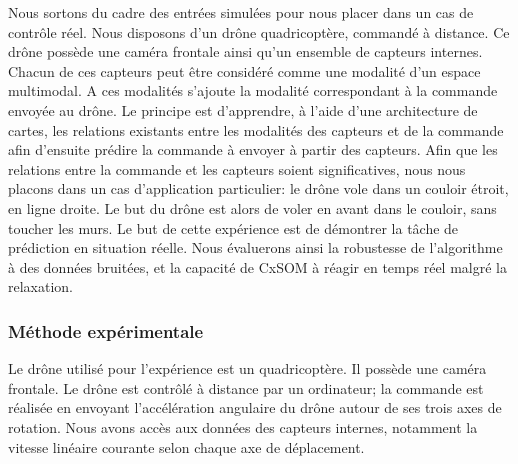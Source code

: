 \documentclass[../main]{subfiles}
\begin{document}
Nous sortons du cadre des entrées simulées pour nous placer dans un cas de contrôle réel. Nous disposons d'un drône quadricoptère, commandé à distance. Ce drône possède une caméra frontale ainsi qu'un ensemble de capteurs internes. Chacun de ces capteurs peut être considéré comme une modalité d'un espace multimodal. A ces modalités s'ajoute la modalité correspondant à la commande envoyée au drône.
Le principe est d'apprendre, à l'aide d'une architecture de cartes, les relations existants entre les modalités des capteurs et de la commande afin d'ensuite prédire la commande à envoyer à partir des capteurs.
Afin que les relations entre la commande et les capteurs soient significatives, nous nous placons dans un cas d'application particulier: le drône vole dans un couloir étroit, en ligne droite. Le but du drône est alors de voler en avant dans le couloir, sans toucher les murs.
Le but de cette expérience est de démontrer la tâche de prédiction en situation réelle. Nous évaluerons ainsi la robustesse de l'algorithme à des données bruitées, et la capacité de CxSOM à réagir en temps réel malgré la relaxation.

\subsubsection{Méthode expérimentale}

Le drône utilisé pour l'expérience est un quadricoptère. Il possède une caméra frontale.
Le drône est contrôlé à distance par un ordinateur; la commande est réalisée en envoyant l'accélération angulaire du drône autour de ses trois axes de rotation.
Nous avons accès aux données des capteurs internes, notamment la vitesse linéaire courante selon chaque axe de déplacement.
\end{document}
